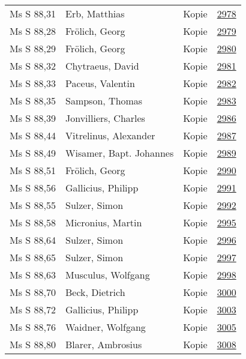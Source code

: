 \documentclass[10pt,a4paper,landscape]{report}
\begin{document}
\begin{longtable}{p{16cm}p{4cm}lr}
Ms S 88,31	&	Erb, Matthias	&	Kopie	&	\href{http://130.60.24.72/assignment/2978}{2978}\\
Ms S 88,28	&	Frölich, Georg	&	Kopie	&	\href{http://130.60.24.72/assignment/2979}{2979}\\
Ms S 88,29	&	Frölich, Georg	&	Kopie	&	\href{http://130.60.24.72/assignment/2980}{2980}\\
Ms S 88,32	&	Chytraeus, David	&	Kopie	&	\href{http://130.60.24.72/assignment/2981}{2981}\\
Ms S 88,33	&	Paceus, Valentin	&	Kopie	&	\href{http://130.60.24.72/assignment/2982}{2982}\\
Ms S 88,35	&	Sampson, Thomas	&	Kopie	&	\href{http://130.60.24.72/assignment/2983}{2983}\\
Ms S 88,39	&	Jonvilliers, Charles	&	Kopie	&	\href{http://130.60.24.72/assignment/2986}{2986}\\
Ms S 88,44	&	Vitrelinus, Alexander	&	Kopie	&	\href{http://130.60.24.72/assignment/2987}{2987}\\
Ms S 88,49	&	Wisamer, Bapt. Johannes	&	Kopie	&	\href{http://130.60.24.72/assignment/2989}{2989}\\
Ms S 88,51	&	Frölich, Georg	&	Kopie	&	\href{http://130.60.24.72/assignment/2990}{2990}\\
Ms S 88,56	&	Gallicius, Philipp	&	Kopie	&	\href{http://130.60.24.72/assignment/2991}{2991}\\
Ms S 88,55	&	Sulzer, Simon	&	Kopie	&	\href{http://130.60.24.72/assignment/2992}{2992}\\
Ms S 88,58	&	Micronius, Martin	&	Kopie	&	\href{http://130.60.24.72/assignment/2995}{2995}\\
Ms S 88,64	&	Sulzer, Simon	&	Kopie	&	\href{http://130.60.24.72/assignment/2996}{2996}\\
Ms S 88,65	&	Sulzer, Simon	&	Kopie	&	\href{http://130.60.24.72/assignment/2997}{2997}\\
Ms S 88,63	&	Musculus, Wolfgang	&	Kopie	&	\href{http://130.60.24.72/assignment/2998}{2998}\\
Ms S 88,70	&	Beck, Dietrich	&	Kopie	&	\href{http://130.60.24.72/assignment/3000}{3000}\\
Ms S 88,72	&	Gallicius, Philipp	&	Kopie	&	\href{http://130.60.24.72/assignment/3003}{3003}\\
Ms S 88,76	&	Waidner, Wolfgang	&	Kopie	&	\href{http://130.60.24.72/assignment/3005}{3005}\\
Ms S 88,80	&	Blarer, Ambrosius	&	Kopie	&	\href{http://130.60.24.72/assignment/3008}{3008}\\

\end{longtable}
\end{document}
